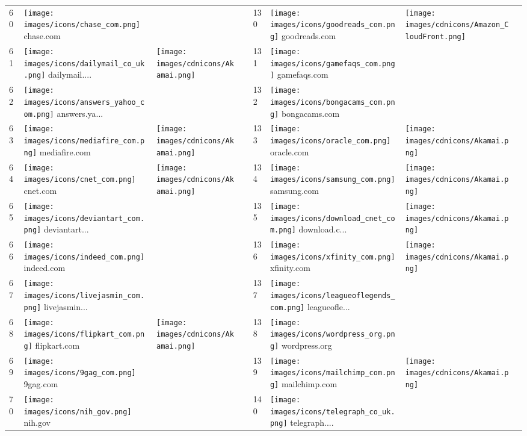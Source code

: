 \begin{table}[tbp]
\begin{tabular}{|llll|llll|}
60 & \texttt{[image: images/icons/chase\_com.png]} chase.com & & & 130 & \texttt{[image: images/icons/goodreads\_com.png]} goodreads.com & \texttt{[image: images/cdnicons/Amazon\_CloudFront.png]} & \\
61 & \texttt{[image: images/icons/dailymail\_co\_uk.png]} dailymail.... & \texttt{[image: images/cdnicons/Akamai.png]} & & 131 & \texttt{[image: images/icons/gamefaqs\_com.png]} gamefaqs.com & & \\
62 & \texttt{[image: images/icons/answers\_yahoo\_com.png]} answers.ya... & & & 132 & \texttt{[image: images/icons/bongacams\_com.png]} bongacams.com & & \\
63 & \texttt{[image: images/icons/mediafire\_com.png]} mediafire.com & \texttt{[image: images/cdnicons/Akamai.png]} & & 133 & \texttt{[image: images/icons/oracle\_com.png]} oracle.com & \texttt{[image: images/cdnicons/Akamai.png]} & \\
64 & \texttt{[image: images/icons/cnet\_com.png]} cnet.com & \texttt{[image: images/cdnicons/Akamai.png]} & & 134 & \texttt{[image: images/icons/samsung\_com.png]} samsung.com & \texttt{[image: images/cdnicons/Akamai.png]} & \\
65 & \texttt{[image: images/icons/deviantart\_com.png]} deviantart... & & & 135 & \texttt{[image: images/icons/download\_cnet\_com.png]} download.c... & \texttt{[image: images/cdnicons/Akamai.png]} & \\
66 & \texttt{[image: images/icons/indeed\_com.png]} indeed.com & & & 136 & \texttt{[image: images/icons/xfinity\_com.png]} xfinity.com & \texttt{[image: images/cdnicons/Akamai.png]} & \\
67 & \texttt{[image: images/icons/livejasmin\_com.png]} livejasmin... & & & 137 & \texttt{[image: images/icons/leagueoflegends\_com.png]} leagueofle... & & \\
68 & \texttt{[image: images/icons/flipkart\_com.png]} flipkart.com & \texttt{[image: images/cdnicons/Akamai.png]} & & 138 & \texttt{[image: images/icons/wordpress\_org.png]} wordpress.org & & \\
69 & \texttt{[image: images/icons/9gag\_com.png]} 9gag.com & & & 139 & \texttt{[image: images/icons/mailchimp\_com.png]} mailchimp.com & \texttt{[image: images/cdnicons/Akamai.png]} & \\
70 & \texttt{[image: images/icons/nih\_gov.png]} nih.gov & & & 140 & \texttt{[image: images/icons/telegraph\_co\_uk.png]} telegraph.... & & \\
\hline
\end{tabular}
\end{table}

